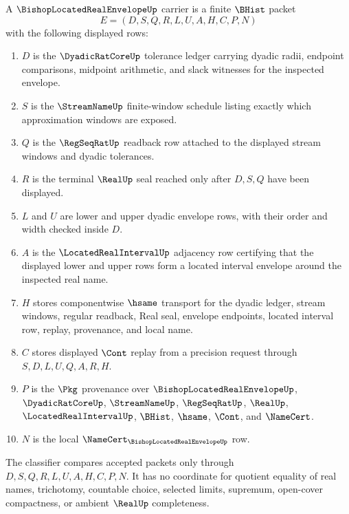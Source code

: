\begin{definition}
\label{def:bishop-located-real-envelope-carrier}
A $\BishopLocatedRealEnvelopeUp$ carrier is a finite $\BHist$ packet
$$
E=(D,S,Q,R,L,U,A,H,C,P,N)
$$
with the following displayed rows:
\begin{enumerate}
\item $D$ is the $\DyadicRatCoreUp$ tolerance ledger carrying dyadic radii, endpoint comparisons, midpoint arithmetic, and slack witnesses for the inspected envelope.
\item $S$ is the $\StreamNameUp$ finite-window schedule listing exactly which approximation windows are exposed.
\item $Q$ is the $\RegSeqRatUp$ readback row attached to the displayed stream windows and dyadic tolerances.
\item $R$ is the terminal $\RealUp$ seal reached only after $D,S,Q$ have been displayed.
\item $L$ and $U$ are lower and upper dyadic envelope rows, with their order and width checked inside $D$.
\item $A$ is the $\LocatedRealIntervalUp$ adjacency row certifying that the displayed lower and upper rows form a located interval envelope around the inspected real name.
\item $H$ stores componentwise $\hsame$ transport for the dyadic ledger, stream windows, regular readback, Real seal, envelope endpoints, located interval row, replay, provenance, and local name.
\item $C$ stores displayed $\Cont$ replay from a precision request through $S,D,L,U,Q,A,R,H$.
\item $P$ is the $\Pkg$ provenance over $\BishopLocatedRealEnvelopeUp$, $\DyadicRatCoreUp$, $\StreamNameUp$, $\RegSeqRatUp$, $\RealUp$, $\LocatedRealIntervalUp$, $\BHist$, $\hsame$, $\Cont$, and $\NameCert$.
\item $N$ is the local $\NameCert_{\BishopLocatedRealEnvelopeUp}$ row.
\end{enumerate}
The classifier compares accepted packets only through $D,S,Q,R,L,U,A,H,C,P,N$. It has no coordinate for quotient equality of real names, trichotomy, countable choice, selected limits, supremum, open-cover compactness, or ambient $\RealUp$ completeness.
\end{definition}

